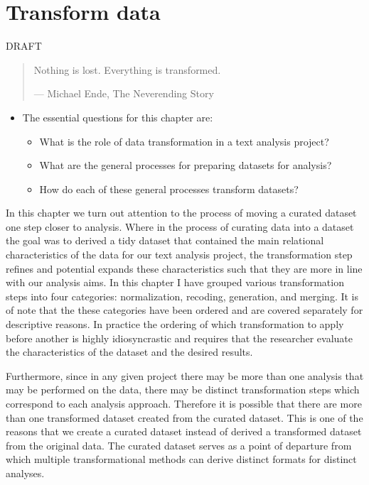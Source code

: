 \documentclass[
]{article}
\providecommand{\tightlist}{%
  \setlength{\itemsep}{0pt}\setlength{\parskip}{0pt}}
\newenvironment{rmdblock}[1]
  {\begin{shaded*}
  \begin{itemize}
  \renewcommand{\labelitemi}{
    \raisebox{-.5\height}[0pt][0pt]{
      {\setkeys{Gin}{width=2em,keepaspectratio}\texttt{[image: assets/images/\#1]}}
    }
  }
  \item
  }
  {
  \end{itemize}
  \end{shaded*}
  }
\newenvironment{rmdkey}
  {\begin{rmdblock}{key}}
  {\end{rmdblock}}
\begin{document}
\hypertarget{transform-data}{%
\section{Transform data}\label{transform-data}}

DRAFT

\begin{quote}
Nothing is lost. Everything is transformed.

--- Michael Ende, The Neverending Story
\end{quote}

\begin{rmdkey}
The essential questions for this chapter are:

\begin{itemize}
\tightlist
\item
  What is the role of data transformation in a text analysis project?
\item
  What are the general processes for preparing datasets for analysis?
\item
  How do each of these general processes transform datasets?
\end{itemize}
\end{rmdkey}

In this chapter we turn out attention to the process of moving a curated dataset one step closer to analysis. Where in the process of curating data into a dataset the goal was to derived a tidy dataset that contained the main relational characteristics of the data for our text analysis project, the transformation step refines and potential expands these characteristics such that they are more in line with our analysis aims. In this chapter I have grouped various transformation steps into four categories: normalization, recoding, generation, and merging. It is of note that the these categories have been ordered and are covered separately for descriptive reasons. In practice the ordering of which transformation to apply before another is highly idiosyncrastic and requires that the researcher evaluate the characteristics of the dataset and the desired results.

Furthermore, since in any given project there may be more than one analysis that may be performed on the data, there may be distinct transformation steps which correspond to each analysis approach. Therefore it is possible that there are more than one transformed dataset created from the curated dataset. This is one of the reasons that we create a curated dataset instead of derived a transformed dataset from the original data. The curated dataset serves as a point of departure from which multiple transformational methods can derive distinct formats for distinct analyses.
\end{document}
